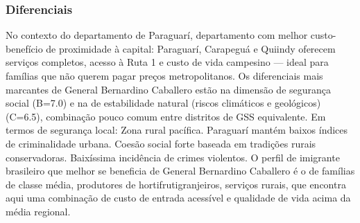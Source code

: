 \subsubsection*{Diferenciais}\label{dif-general-bernardino-caballero-0912}
No contexto do departamento de Paraguarí, departamento com melhor custo-benefício de proximidade à capital: Paraguarí, Carapeguá e Quiindy oferecem serviços completos, acesso à Ruta 1 e custo de vida campesino — ideal para famílias que não querem pagar preços metropolitanos. Os diferenciais mais marcantes de General Bernardino Caballero estão na dimensão de segurança social (B=7.0) e na de estabilidade natural (riscos climáticos e geológicos) (C=6.5), combinação pouco comum entre distritos de GSS equivalente. Em termos de segurança local: Zona rural pacífica. Paraguarí mantém baixos índices de criminalidade urbana. Coesão social forte baseada em tradições rurais conservadoras. Baixíssima incidência de crimes violentos. O perfil de imigrante brasileiro que melhor se beneficia de General Bernardino Caballero é o de famílias de classe média, produtores de hortifrutigranjeiros, serviços rurais, que encontra aqui uma combinação de custo de entrada acessível e qualidade de vida acima da média regional.
